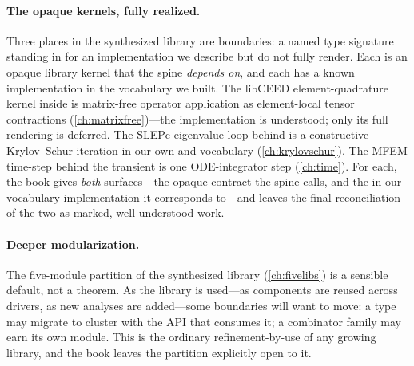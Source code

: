 \paragraph{The opaque kernels, fully realized.}
Three places in the synthesized library are  boundaries: a named
type signature standing in for an implementation we describe but do not fully render.
Each is an opaque library kernel that the spine \emph{depends on}, and each has a
known implementation in the vocabulary we built. The libCEED element-quadrature kernel
inside  is matrix-free operator application as element-local tensor
contractions (\cref{ch:matrixfree})---the implementation is understood; only its full
rendering is deferred. The SLEPc eigenvalue loop behind  is a
constructive Krylov--Schur iteration in our own  and
 vocabulary (\cref{ch:krylovschur}). The MFEM time-step behind the
transient  is one ODE-integrator step (\cref{ch:time}). For each, the
book gives \emph{both} surfaces---the opaque contract the spine calls, and the
in-our-vocabulary implementation it corresponds to---and leaves the final reconciliation
of the two as marked, well-understood work.

\paragraph{Deeper modularization.}
The five-module partition of the synthesized library (\cref{ch:fivelibs}) is a sensible
default, not a theorem. As the library is used---as components are reused across
drivers, as new analyses are added---some boundaries will want to move: a type may
migrate to cluster with the API that consumes it; a combinator family may earn its own
module. This is the ordinary refinement-by-use of any growing library, and the book
leaves the partition explicitly open to it.

